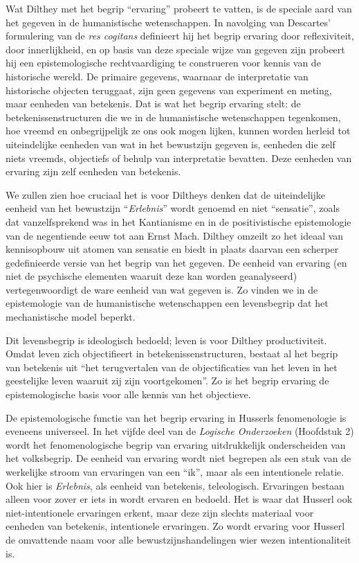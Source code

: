 Wat Dilthey met het begrip ``ervaring'' probeert te vatten, is de speciale aard van het gegeven in de humanistische wetenschappen. In navolging van Descartes' formulering van de \textit{res cogitans} definieert hij het begrip ervaring door reflexiviteit, door innerlijkheid, en op basis van deze speciale wijze van gegeven zijn probeert hij een epistemologische rechtvaardiging te construeren voor kennis van de historische wereld. De primaire gegevens, waarnaar de interpretatie van historische objecten teruggaat, zijn geen gegevens van experiment en meting, maar eenheden van betekenis. Dat is wat het begrip ervaring stelt: de betekenissenstructuren die we in de humanistische wetenschappen tegenkomen, hoe vreemd en onbegrijpelijk ze ons ook mogen lijken, kunnen worden herleid tot uiteindelijke eenheden van wat in het bewustzijn gegeven is, eenheden die zelf niets vreemds, objectiefs of behulp van interpretatie bevatten. Deze eenheden van ervaring zijn zelf eenheden van betekenis.

We zullen zien hoe cruciaal het is voor Diltheys denken dat de uiteindelijke eenheid van het bewustzijn ``\textit{Erlebnis}'' wordt genoemd en niet ``sensatie'', zoals dat vanzelfsprekend was in het Kantianisme en in de positivistische epistemologie van de negentiende eeuw tot aan Ernst Mach. Dilthey omzeilt zo het ideaal van kennisopbouw uit atomen van sensatie en biedt in plaats daarvan een scherper gedefinieerde versie van het begrip van het gegeven. De eenheid van ervaring (en niet de psychische elementen waaruit deze kan worden geanalyseerd) vertegenwoordigt de ware eenheid van wat gegeven is. Zo vinden we in de epistemologie van de humanistische wetenschappen een levensbegrip dat het mechanistische model beperkt.

Dit levensbegrip is ideologisch bedoeld; leven is voor Dilthey productiviteit. Omdat leven zich objectifieert in betekenissenstructuren, bestaat al het begrip van betekenis uit ``het terugvertalen van de objectificaties van het leven in het geestelijke leven waaruit zij zijn voortgekomen''. Zo is het begrip ervaring de epistemologische basis voor alle kennis van het objectieve.

De epistemologische functie van het begrip ervaring in Husserls fenomenologie is eveneens universeel. In het vijfde deel van de \textit{Logische Onderzoeken} (Hoofdstuk 2) wordt het fenomenologische begrip van ervaring uitdrukkelijk onderscheiden van het volksbegrip. De eenheid van ervaring wordt niet begrepen als een stuk van de werkelijke stroom van ervaringen van een ``ik'', maar als een intentionele relatie. Ook hier is \textit{Erlebnis}, als eenheid van betekenis, teleologisch. Ervaringen bestaan alleen voor zover er iets in wordt ervaren en bedoeld. Het is waar dat Husserl ook niet-intentionele ervaringen erkent, maar deze zijn slechts materiaal voor eenheden van betekenis, intentionele ervaringen. Zo wordt ervaring voor Husserl de omvattende naam voor alle bewustzijnshandelingen wier wezen intentionaliteit is.

